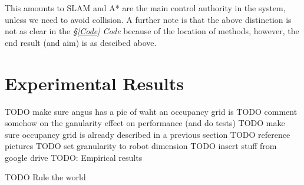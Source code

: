 \documentclass[11pt, a4paper]{article}
\begin{document}
This amounts to SLAM and A* are the main control authority in the system, unless we need 
to avoid collision. A further note is that the above distinction is not as clear in the 
\textit{\S\ref{Code} Code} because of the location of methods, however, the end result 
(and aim) is as descibed above.




\section{Experimental Results}
\label{Experimental_Results}






TODO make sure angus has a pic of waht an occupancy grid is
TODO comment somehow on the ganularity effect on performance (and do tests)
TODO make sure occupancy grid is already described in a previous section
TODO reference pictures
TODO set granularity to robot dimension
TODO insert stuff from google drive
TODO: Empirical results


TODO Rule the world



\end{document}
